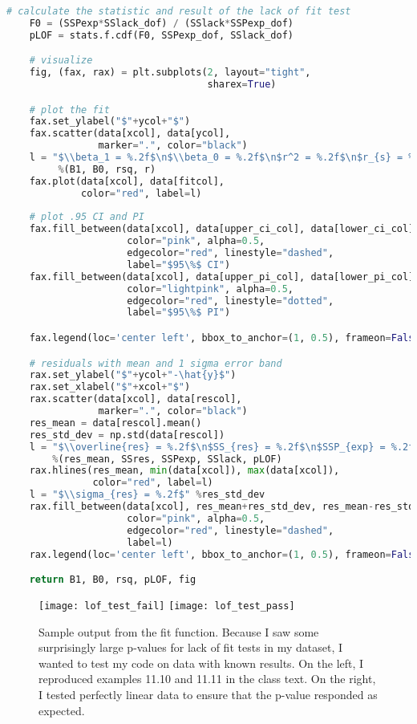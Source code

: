 \documentclass[12pt, letterpaper]{article}
\begin{document}
\begin{lstlisting}[language=python, caption=Python function to compute fit parameters and perform lack of fit test; also computes 0.95 confidence and prediction intervals, label={lst:fit}]
    # calculate the statistic and result of the lack of fit test
    F0 = (SSPexp*SSlack_dof) / (SSlack*SSPexp_dof)
    pLOF = stats.f.cdf(F0, SSPexp_dof, SSlack_dof)

    # visualize
    fig, (fax, rax) = plt.subplots(2, layout="tight",
                                   sharex=True)

    # plot the fit
    fax.set_ylabel("$"+ycol+"$")
    fax.scatter(data[xcol], data[ycol],
                marker=".", color="black")
    l = "$\\beta_1 = %.2f$\n$\\beta_0 = %.2f$\n$r^2 = %.2f$\n$r_{s} = %.2f$"\
         %(B1, B0, rsq, r)
    fax.plot(data[xcol], data[fitcol],
             color="red", label=l)
    
    # plot .95 CI and PI
    fax.fill_between(data[xcol], data[upper_ci_col], data[lower_ci_col],
                     color="pink", alpha=0.5,
                     edgecolor="red", linestyle="dashed",
                     label="$95\%$ CI")
    fax.fill_between(data[xcol], data[upper_pi_col], data[lower_pi_col],
                     color="lightpink", alpha=0.5,
                     edgecolor="red", linestyle="dotted",
                     label="$95\%$ PI")

    fax.legend(loc='center left', bbox_to_anchor=(1, 0.5), frameon=False)

    # residuals with mean and 1 sigma error band
    rax.set_ylabel("$"+ycol+"-\hat{y}$")
    rax.set_xlabel("$"+xcol+"$")
    rax.scatter(data[xcol], data[rescol],
                marker=".", color="black")
    res_mean = data[rescol].mean()
    res_std_dev = np.std(data[rescol])
    l = "$\\overline{res} = %.2f$\n$SS_{res} = %.2f$\n$SSP_{exp} = %.2f$\n$SS_{lack} = %.2f$\n$p_{LOF} = %.4f$"\
        %(res_mean, SSres, SSPexp, SSlack, pLOF)
    rax.hlines(res_mean, min(data[xcol]), max(data[xcol]),
               color="red", label=l)
    l = "$\\sigma_{res} = %.2f$" %res_std_dev
    rax.fill_between(data[xcol], res_mean+res_std_dev, res_mean-res_std_dev,
                     color="pink", alpha=0.5,
                     edgecolor="red", linestyle="dashed",
                     label=l)
    rax.legend(loc='center left', bbox_to_anchor=(1, 0.5), frameon=False)

    return B1, B0, rsq, pLOF, fig
\end{lstlisting}

\begin{figure}[H]
    \texttt{[image: lof\_test\_fail]}
    \hfill
    \texttt{[image: lof\_test\_pass]}
    \caption{Sample output from the fit function. Because I saw some surprisingly large p-values for lack of fit tests in my dataset, I wanted to test my code on data with known results. On the left, I reproduced examples 11.10 and 11.11 in the class text. On the right, I tested perfectly linear data to ensure that the p-value responded as expected.}
\end{figure}
\end{document}
